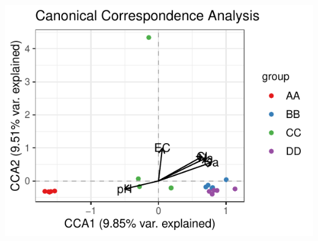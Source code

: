 \documentclass[
]{article}
\begin{document}
\includegraphics{workshop_files/figure-latex/unnamed-chunk-30-1.pdf}
\end{document}
